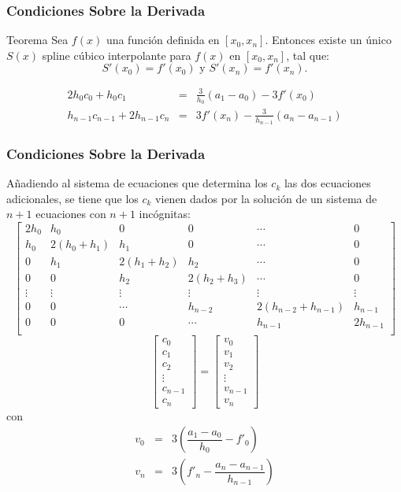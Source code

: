 \documentclass[10pt]{beamer}
\begin{document}
\frame
{
\frametitle{Condiciones Sobre la Derivada}
\begin{block}{Teorema}
Sea $f(x)$ una funci\'on definida en $[x_0,x_n]$. Entonces existe un \'unico $S(x)$ spline c\'ubico interpolante para $f(x)$ en $[x_0,x_n]$, tal que:
$$
                S'(x_0) =  f'(x_0)      \text{  y  }           S'(x_n) = f'(x_n).
$$
\end{block}

\begin{eqnarray}
2h_0c_0 + h_0c_1 & = & \frac{3}{h_0}(a_1 - a_0 ) - 3f'(x_0)\nonumber\\
h_{n-1}c_{n-1} + 2h_{n-1}c_n & = & 3f'(x_n) - \frac{3}{h_{n-1}} (a_n - a_{n-1})\nonumber
\end{eqnarray}
}
\frame
{
\frametitle{Condiciones Sobre la Derivada}
A\~nadiendo al sistema de ecuaciones que determina los $c_k$ las dos ecuaciones adicionales, se tiene que los $c_k$ vienen dados por la soluci\'on de un sistema de $n + 1$ ecuaciones con $n + 1$ inc\'ognitas:
{\scriptsize
$$
 \left[\begin{array}{cccccc}
       2h_0 & h_0 & 0 & 0 & \cdots & 0\\
       h_0 & 2(h_0+h_1) & h_1 & 0 & \cdots & 0\\
       0 & h_1 & 2(h_1+h_2) & h_2 &  \cdots & 0\\
       0 & 0 & h_2 & 2(h_2+h_3) & \cdots & 0\\
       \vdots & \vdots & \vdots & \vdots & \vdots & \vdots\\
       0 & 0  & \cdots & h_{n-2} & 2(h_{n-2}+h_{n-1}) & h_{n-1}\\
       0 & 0  & 0 &\cdots & h_{n-1} & 2h_{n-1}\\
      \end{array}\right]$$
      $$\left[\begin{array}{c}
                               c_0\\
                               c_1\\
                               c_2\\
                               \vdots\\
                               c_{n-1}\\
                               c_n
                              \end{array}\right] = \left[\begin{array}{c}
                               v_0\\
                               v_1\\
                               v_2\\
                               \vdots\\
                               v_{n-1}\\
                               v_n
                              \end{array}\right]
$$}
con
\begin{eqnarray}
\nonumber v_0 & = & 3\left(\dfrac{a_1 - a_0}{h_0}-f'_0\right)\\
\nonumber v_n & = & 3\left(f'_n -\dfrac{a_n - a_{n-1}}{h_{n-1}}\right)
\end{eqnarray}
}
\end{document}
